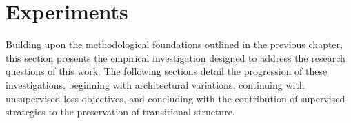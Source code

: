\chapter{Experiments} \label{ch:experiments}

Building upon the methodological foundations outlined in the previous chapter, this section presents the empirical investigation designed to address the research questions of this work. The following sections detail the progression of these investigations, beginning with architectural variations, continuing with unsupervised loss objectives, and concluding with the contribution of supervised strategies to the preservation of transitional structure.






